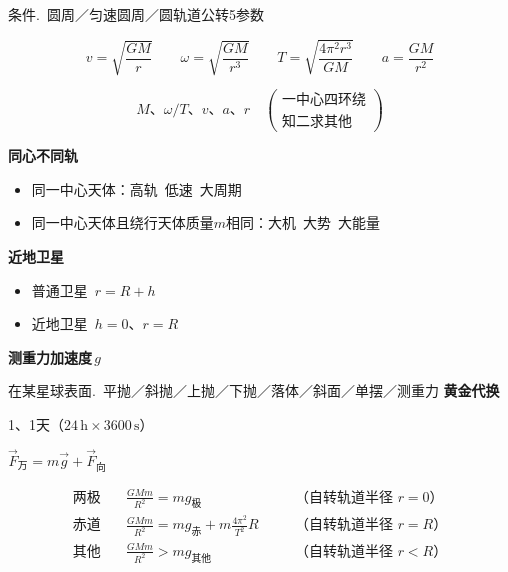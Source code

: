条件.\ 圆周／匀速圆周／圆轨道\hfill 公转5参数

\[
v=\sqrt{\frac{GM}{r}}\qquad
\omega=\sqrt{\frac{GM}{r^{3}}}\qquad
T=\sqrt{\frac{4\pi^{2}r^{3}}{GM}}\qquad
a=\frac{GM}{r^{2}}
\]

\[
M\text{、}\omega/T\text{、}v\text{、}a\text{、}r\quad
\left(\begin{array}{l}\text{一中心四环绕}\\ \text{知二求其他}\end{array}\right)
\]

\textbf{同心不同轨}
\begin{itemize}
\item 同一中心天体：高轨\ 低速\ 大周期
\item 同一中心天体且绕行天体质量$m$相同：大机\ 大势\ 大能量
\end{itemize}

\textbf{近地卫星}
\begin{itemize}
\item 普通卫星\ $r=R+h$
\item 近地卫星\ $h=0$、$r=R$
\end{itemize}
\textbf{测重力加速度}$\,g$

在某星球表面.\ 平抛／斜抛／上抛／下抛／落体／斜面／单摆／测重力
\textbf{黄金代换}

1、\quad 1天（$24\,\mathrm{h}\times3600\,\mathrm{s}$）


$\vec{F}_{\text{万}}=m\vec{g}+\vec{F}_{\text{向}}$

\[
\begin{aligned}
\text{两极}\quad & \frac{GMm}{R^{2}}=mg_{\text{极}} & & \quad\text{（自转轨道半径 $r=0$）}\\[4pt]
\text{赤道}\quad & \frac{GMm}{R^{2}}=mg_{\text{赤}}+m\frac{4\pi^{2}}{T^{2}}R & & \quad\text{（自转轨道半径 $r=R$）}\\[4pt]
\text{其他}\quad & \frac{GMm}{R^{2}}>mg_{\text{其他}} & & \quad\text{（自转轨道半径 $r<R$）}
\end{aligned}
\]

